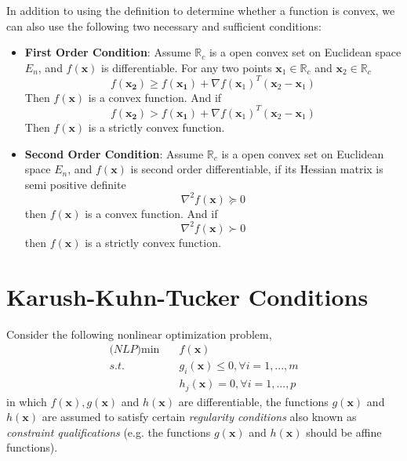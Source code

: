 \documentclass{article}
\begin{document}
In addition to using the definition to determine whether a function is convex, we can also use the following two necessary and sufficient conditions:

\begin{itemize}
	\item \textbf{First Order Condition}: Assume $\mathbb{R}_c$ is a open convex set on Euclidean space $E_n$, and $f(\bm{x})$ is differentiable. For any two points $\bm{x}_1 \in \mathbb{R}_c$ and $\bm{x}_2 \in \mathbb{R}_c$
	\begin{equation}
		f(\bm{x_2}) \geq f(\bm{x_1}) + \nabla f(\bm{x}_1)^T(\bm{x}_2 - \bm{x}_1) 
	\end{equation}
	Then $f(\bm{x})$ is a convex function. And if
	 \begin{equation}
	 f(\bm{x_2}) > f(\bm{x_1}) + \nabla f(\bm{x}_1)^T(\bm{x}_2 - \bm{x}_1) 
	 \end{equation}
	 Then $f(\bm{x})$ is a strictly convex function.
	 
	 \item \textbf{Second Order Condition}: Assume $\mathbb{R}_c$ is a open convex set on Euclidean space $E_n$, and $f(\bm{x})$ is second order differentiable, if its Hessian matrix is semi positive definite
	 \begin{equation}
	 \nabla^2 f(\bm{x}) \succeq 0
	 \end{equation}
	 then $f(\bm{x})$ is a convex function. And if
	 \begin{equation}
	 \nabla^2 f(\bm{x}) \succ 0
	 \end{equation}
	 then $f(\bm{x})$ is a strictly convex function.
\end{itemize}

\section{Karush-Kuhn-Tucker Conditions}

Consider the following nonlinear optimization problem,
\begin{align*}
	\textit{(NLP)}\min \quad & f(\bm{x}) \\
	s.t. \quad & g_i(\bm{x}) \leq 0, \forall i = 1, ..., m \\
	& h_j(\bm{x}) = 0, \forall i = 1, ..., p 
\end{align*}
in which $f(\bm{x}), g(\bm{x})$ and $h(\bm{x})$ are differentiable,  the functions $g(\bm{x})$ and $h(\bm{x})$ are assumed to satisfy certain \textit{regularity conditions} also known as \textit{constraint qualifications} (e.g. the functions $g(\bm{x})$ and $h(\bm{x})$ should be affine functions). 
\end{document}
